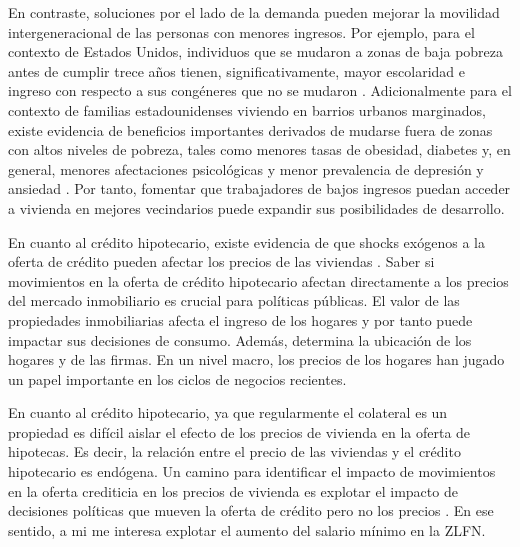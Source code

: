  
En contraste, soluciones por el lado de la demanda pueden mejorar la movilidad intergeneracional de las personas con menores ingresos. Por ejemplo, para el contexto de Estados Unidos, individuos que se mudaron a zonas de baja pobreza antes de cumplir trece años tienen, significativamente, mayor escolaridad e ingreso con respecto a sus congéneres que no se mudaron \citep{chetty_hendren_katz_2016,chetty_hendren_2018}. Adicionalmente para el contexto de familias estadounidenses viviendo en barrios urbanos marginados, existe evidencia de beneficios importantes derivados de mudarse fuera de zonas con altos niveles de pobreza, tales como menores tasas de obesidad, diabetes y, en general, menores afectaciones psicológicas y menor prevalencia de depresión y ansiedad \citep{kling_liebeman_katz_2007}. Por tanto, fomentar que trabajadores de bajos ingresos puedan acceder a vivienda en mejores vecindarios puede expandir sus posibilidades de desarrollo.


En cuanto al crédito hipotecario, existe evidencia de que shocks exógenos a la oferta de crédito pueden afectar los precios de las viviendas \citep{imbs_favara_2010}. Saber si movimientos en la oferta de crédito hipotecario afectan directamente a los precios del mercado inmobiliario es crucial para políticas públicas. El valor de las propiedades inmobiliarias afecta el ingreso de los hogares y por tanto puede impactar sus decisiones de consumo. Además, determina la ubicación de los hogares y de las firmas. En un nivel macro, los precios de los hogares han jugado un papel importante en los ciclos de negocios recientes.


En cuanto al crédito hipotecario, ya que regularmente el colateral es un propiedad es difícil aislar el efecto de los precios de vivienda en la oferta de hipotecas. Es decir, la relación entre el precio de las viviendas y el crédito hipotecario es endógena. Un camino para identificar el impacto de movimientos en la oferta crediticia en los precios de vivienda es explotar el impacto de decisiones políticas que mueven la oferta de crédito pero no los precios \citep{imbs_favara_2010}. En ese sentido, a mi me interesa explotar el aumento del salario mínimo en la ZLFN.


